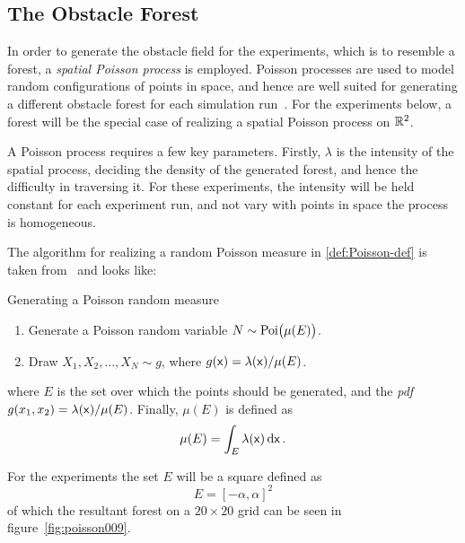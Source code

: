 \subsection{The Obstacle Forest}
\label{sec:Poisson-Process}

In order to generate the obstacle field for the experiments, which is to
resemble a forest, a \textit{spatial Poisson process} is employed. Poisson
processes are used to model random configurations of points in space, and hence
are well suited for generating a different obstacle forest for each simulation
run~\cite{Kroese_2014}. For the experiments below, a forest will be the special
case of realizing a spatial Poisson process on \(\mathbb{R}^2\).

A Poisson process requires a few key parameters. Firstly, \(\lambda\) is the
intensity of the spatial process, deciding the density of the generated forest,
and hence the difficulty in traversing it. For these experiments, the intensity
will be held constant for each experiment run, and not vary with points in space
\ie the process is homogeneous.

The algorithm for realizing a random Poisson measure in \cref{def:Poisson-def}
is taken from~\cite[Definition~1.1.1][34]{Kroese_2014} and looks like:

\begin{definition}{Generating a Poisson random measure}
  \label{def:Poisson-def}
  \begin{enumerate}
  \item Generate a Poisson random variable \(N \sim \operatorname{Poi} \bigl( \mu(E) \bigr) \).
  \item Draw \(X_1,X_2,\ldots,X_N \sim g\), where \(g({\mathbf{\mathsf{x}}}) =
    \lambda({\mathbf{\mathsf{x}}})/ \mu(E)\).
  \end{enumerate}
\end{definition}
where \(E\) is the set over which the points should be generated, and the
\textit{pdf} \(g(x_1, x_2) = \lambda({\mathbf{\mathsf{x}}})/\mu(E)\). Finally, \(\mu(E)\) is
defined as
\[
  \mu(E) = \int_{E} \lambda({\mathbf{\mathsf{x}}})\, \mathrm{d} {\mathbf{\mathsf{x}}} \, .
\]

For the experiments the set \(E\) will be a square defined as
\[
  E = {[-\alpha, \alpha]}^2
\]
of which the resultant forest on a \(20 \times 20\) grid can be seen in
figure~\cref{fig:poisson009}.

